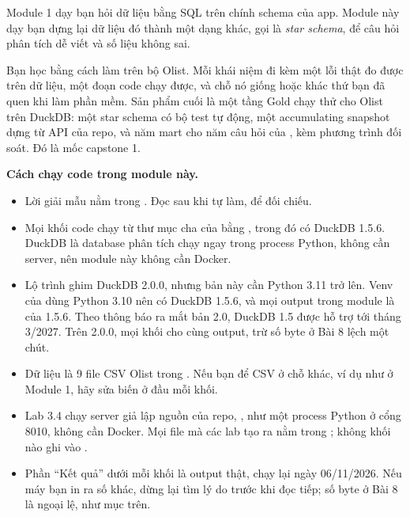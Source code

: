 Module 1 dạy bạn hỏi dữ liệu bằng SQL trên chính schema của app. Module này dạy bạn dựng lại dữ liệu đó thành một dạng khác, gọi là \textit{star schema}, để câu hỏi phân tích dễ viết và số liệu không sai.

Bạn học bằng cách làm trên bộ Olist. Mỗi khái niệm đi kèm một lỗi thật đo được trên dữ liệu, một đoạn code chạy được, và chỗ nó giống hoặc khác thứ bạn đã quen khi làm phần mềm. Sản phẩm cuối là một tầng Gold chạy thử cho Olist trên DuckDB: một star schema có bộ test tự động, một accumulating snapshot dựng từ API của repo, và năm mart cho năm câu hỏi của , kèm phương trình đối soát. Đó là mốc capstone 1.

\begin{ghichu}
\textbf{Cách chạy code trong module này.}
\begin{itemize}
  \item Lời giải mẫu nằm trong . Đọc sau khi tự làm, để đối chiếu.
  \item Mọi khối code chạy từ thư mục cha của  bằng , trong đó có DuckDB 1.5.6. DuckDB là database phân tích chạy ngay trong process Python, không cần server, nên module này không cần Docker.
  \item Lộ trình ghim DuckDB 2.0.0, nhưng bản này cần Python 3.11 trở lên. Venv của  dùng Python 3.10 nên có DuckDB 1.5.6, và mọi output trong module là của 1.5.6. Theo thông báo ra mắt bản 2.0, DuckDB 1.5 được hỗ trợ tới tháng 3/2027. Trên 2.0.0, mọi khối cho cùng output, trừ số byte ở Bài 8 lệch một chút.
  \item Dữ liệu là 9 file CSV Olist trong . Nếu bạn để CSV ở chỗ khác, ví dụ  như ở Module 1, hãy sửa biến  ở đầu mỗi khối.
  \item Lab 3.4 chạy server giả lập nguồn của repo, , như một process Python ở cổng 8010, không cần Docker. Mọi file mà các lab tạo ra nằm trong ; không khối nào ghi vào .
  \item Phần ``Kết quả'' dưới mỗi khối là output thật, chạy lại ngày 06/11/2026. Nếu máy bạn in ra số khác, dừng lại tìm lý do trước khi đọc tiếp; số byte ở Bài 8 là ngoại lệ, như mục trên.
\end{itemize}
\end{ghichu}

